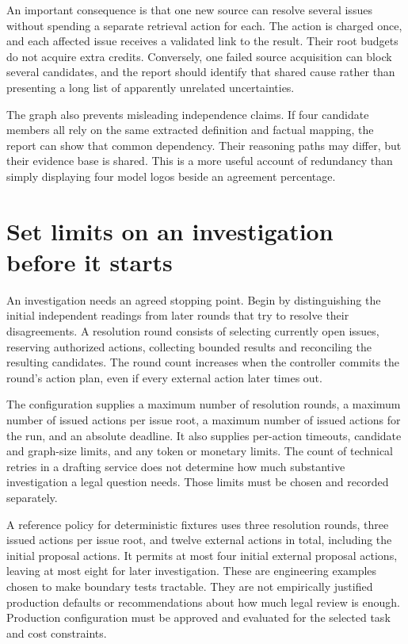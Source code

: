 
An important consequence is that one new source can resolve several issues
without spending a separate retrieval action for each. The action is charged once,
and each affected issue receives a validated link to the result. Their root
budgets do not acquire extra credits. Conversely, one failed source acquisition
can block several candidates, and the report should identify that shared cause
rather than presenting a long list of apparently unrelated uncertainties.

The graph also prevents misleading independence claims. If four candidate members
all rely on the same extracted definition and factual mapping, the report can
show that common dependency. Their reasoning paths may differ, but their evidence
base is shared. This is a more useful account of redundancy than simply displaying
four model logos beside an agreement percentage.

\section{Set limits on an investigation before it starts}
\label{merge:M06:12}


An investigation needs an agreed stopping point. Begin by distinguishing the
initial independent readings from later rounds that try to resolve their
disagreements. A resolution round consists of selecting currently open
issues, reserving authorized actions, collecting bounded results and reconciling
the resulting candidates. The round count increases when the controller commits
the round's action plan, even if every external action later times out.

The configuration supplies a maximum number of resolution rounds, a maximum
number of issued actions per issue root, a maximum number of issued actions for
the run, and an absolute deadline. It also supplies per-action timeouts, candidate
and graph-size limits, and any token or monetary limits. The count of technical retries in a drafting service does not determine how
much substantive investigation a legal question needs. Those limits must be
chosen and recorded separately.

A reference policy for deterministic fixtures uses three resolution rounds,
three issued actions per issue root, and twelve external actions in total,
including the initial proposal actions. It permits at most four initial external
proposal actions, leaving at most eight for later investigation. These are
engineering examples chosen to make boundary tests tractable. They are not
empirically justified production defaults or recommendations about how much
legal review is enough. Production configuration must be approved and evaluated
for the selected task and cost constraints.

